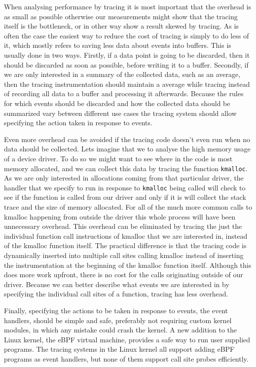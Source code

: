 \documentclass[12pt,twoside,notitlepage]{report}
\begin{document}
        When analysing performance by tracing it is most important that the overhead is as small as possible otherwise our measurements might show that the tracing itself is the bottleneck, or in other way show a result skewed by tracing. As is often the case the easiest way to reduce the cost of tracing is simply to do less of it, which mostly refers to saving less data about events into buffers. This is usually done in two ways. Firstly, if a data point is going to be discarded, then it should be discarded as soon as possible, before writing it to a buffer. Secondly, if we are only interested in a summary of the collected data, such as an average, then the tracing instrumentation should maintain a average while tracing instead of recording all data to a buffer and processing it afterwards. Because the rules for which events should be discarded and how the collected data should be summarized vary between different use cases the tracing system should allow specifying the action taken in response to events.

		Even more overhead can be avoided if the tracing code doesn't even run when no data should be collected. Lets imagine that we to analyse the high memory usage of a device driver. To do so we might want to see where in the code is most memory allocated, and we can collect this data by tracing the function \texttt{kmalloc}. As we are only interested in allocations coming from that particular driver, the handler that we specify to run in response to \texttt{kmalloc} being called will check to see if the function is called from our driver and only if it is will collect the stack trace and the size of memory allocated. For all of the much more common calls to kmalloc happening from outside the driver this whole process will have been unnecessary overhead. This overhead can be eliminated by tracing the just the individual function call instructions of kmalloc that we are interested in, instead of the kmalloc function itself. The practical difference is that the tracing code is dynamically inserted into multiple call sites calling kmalloc instead of inserting the instrumentation at the beginning of the kmalloc function itself. Although this does more work upfront, there is no cost for the calls originating outside of our driver. Because we can better describe what events we are interested in by specifying the individual call sites of a function, tracing has less overhead.

		Finally, specifying the actions to be taken in response to events, the event handlers, should be simple and safe, preferably not requiring custom kernel modules, in which any mistake could crash the kernel. A new addition to the Linux kernel, the eBPF virtual machine, provides a safe way to run user supplied programs. The tracing systems in the Linux kernel all support adding eBPF programs as event handlers, but none of them support call site probes efficiently.
\end{document}
